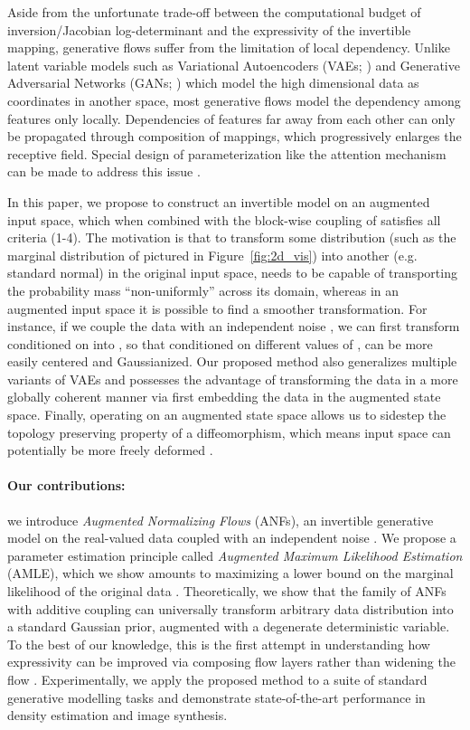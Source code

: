 \documentclass{article}
\begin{document}
Aside from the unfortunate trade-off between the computational budget of inversion/Jacobian log-determinant and the expressivity of the invertible mapping, generative flows suffer from the limitation of local dependency. 
Unlike latent variable models such as Variational Autoencoders (VAEs; \citealt{kingma2013auto, rezende2014stochastic}) and Generative Adversarial Networks (GANs; \citealt{goodfellow2014generative}) which model the high dimensional data as coordinates in another space, most generative flows model the dependency among features only locally. 
Dependencies of features far away from each other can only be propagated through composition of mappings, which progressively enlarges the receptive field. 
Special design of parameterization like the attention mechanism can be made to address this issue \citep{ho2019flow++}.

In this paper, we propose to construct an invertible model on an augmented input space, which when combined with the block-wise coupling of \citet{dinh2016density} satisfies all criteria (1-4). 
The motivation is that to transform some distribution (such as the marginal distribution of  pictured in Figure~\ref{fig:2d_vis}) into another (e.g. standard normal) in the original input space,  needs to be capable of transporting the probability mass ``non-uniformly'' across its domain, 
whereas in an augmented input space it is possible to find a smoother transformation.
For instance, if we couple the data  with an independent noise , we can first transform  conditioned on  into , so that conditioned on different values of ,  can be more easily centered and Gaussianized. 
Our proposed method also generalizes multiple variants of VAEs and possesses the advantage of transforming the data in a more globally coherent manner via first embedding the data in the augmented state space.
Finally, operating on an augmented state space allows us to sidestep the topology preserving property of a diffeomorphism, which means input space can potentially be more freely deformed \citep{dupont2019augmented}. 

\paragraph{Our contributions:}
we introduce \emph{Augmented Normalizing Flows} (ANFs), an invertible generative model on the real-valued data  coupled with an independent noise . 
We propose a parameter estimation principle called \emph{Augmented Maximum Likelihood Estimation} (AMLE), which we show amounts to maximizing a lower bound on the marginal likelihood of the original data . 
Theoretically, we show that the family of ANFs with additive coupling can universally transform arbitrary data distribution into a standard Gaussian prior, augmented with a degenerate deterministic variable. 
To the best of our knowledge, this is the first attempt in understanding how expressivity can be improved via composing flow layers  rather than widening the flow \citep{huang2018neural}. 
Experimentally, we apply the proposed method to a suite of standard generative modelling tasks and demonstrate state-of-the-art performance in density estimation and image synthesis. 
\end{document}
